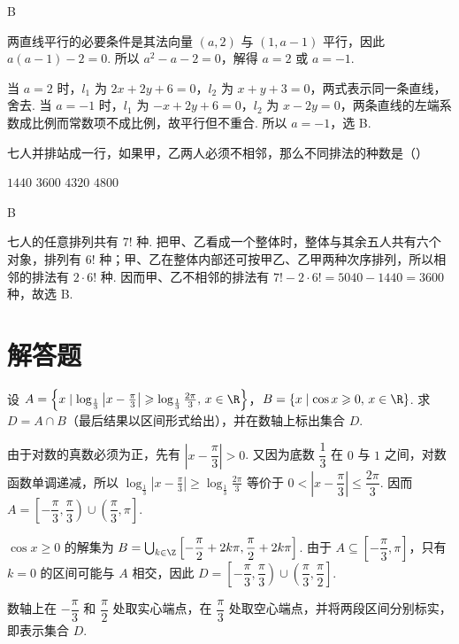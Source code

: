 \documentclass[UTF8,a4paper,oneside,11pt]{ctexbook}
\begin{document}
\begin{answer}
B
\end{answer}

\begin{solution}
两直线平行的必要条件是其法向量 \((a,2)\) 与 \((1,a-1)\) 平行，因此
\(a(a-1)-2=0\). 所以 \(a^2-a-2=0\)，解得 \(a=2\) 或 \(a=-1\).

当 \(a=2\) 时，\(l_1\) 为 \(2x+2y+6=0\)，\(l_2\) 为 \(x+y+3=0\)，两式表示同一条直线，舍去. 当 \(a=-1\) 时，\(l_1\) 为 \(-x+2y+6=0\)，\(l_2\) 为 \(x-2y=0\)，两条直线的左端系数成比例而常数项不成比例，故平行但不重合. 所以 \(a=-1\)，选 B.
\end{solution}

\begin{problem}
七人并排站成一行，如果甲，乙两人必须不相邻，那么不同排法的种数是（\quad）

\choices
    {\(1440\)}
    {\(3600\)}
    {\(4320\)}
    {\(4800\)}
\end{problem}

\begin{answer}
B
\end{answer}

\begin{solution}
七人的任意排列共有 \(7!\) 种. 把甲、乙看成一个整体时，整体与其余五人共有六个对象，排列有 \(6!\) 种；甲、乙在整体内部还可按甲乙、乙甲两种次序排列，所以相邻的排法有 \(2\cdot6!\) 种. 因而甲、乙不相邻的排法有
\(7!-2\cdot6!=5040-1440=3600\) 种，故选 B.
\end{solution}

\section{解答题}

\begin{problem}
设 \(A=\left\{x\mid \log_{\frac{1}{3}}\left|x-\frac{\pi}{3}\right|\geqslant \log_{\frac{1}{3}}\frac{2\pi}{3},\,x\in\R\right\}\)，\(B=\left\{x\mid \cos x\geqslant 0,\,x\in\R\right\}\). 求 \(D=A\cap B\)（最后结果以区间形式给出），并在数轴上标出集合 \(D\).
\end{problem}

\begin{solution}
由于对数的真数必须为正，先有 \(\left|x-\dfrac{\pi}{3}\right|>0\). 又因为底数 \(\dfrac13\) 在 \(0\) 与 \(1\) 之间，对数函数单调递减，所以
\(\log_{\frac13}\left|x-\frac\pi3\right|\geqslant\log_{\frac13}\frac{2\pi}{3}\) 等价于 \(0<\left|x-\dfrac\pi3\right|\leqslant\dfrac{2\pi}{3}\). 因而
\(A=\left[-\dfrac\pi3,\dfrac\pi3\right)\cup\left(\dfrac\pi3,\pi\right]\).

\(\cos x\geqslant0\) 的解集为 \(B=\bigcup_{k\in\Z}\left[-\dfrac\pi2+2k\pi,\dfrac\pi2+2k\pi\right]\). 由于 \(A\subseteq\left[-\dfrac\pi3,\pi\right]\)，只有 \(k=0\) 的区间可能与 \(A\) 相交，因此
\(D=\left[-\dfrac\pi3,\dfrac\pi3\right)\cup\left(\dfrac\pi3,\dfrac\pi2\right]\).

数轴上在 \(-\dfrac\pi3\) 和 \(\dfrac\pi2\) 处取实心端点，在 \(\dfrac\pi3\) 处取空心端点，并将两段区间分别标实，即表示集合 \(D\).
\end{solution}
\end{document}

